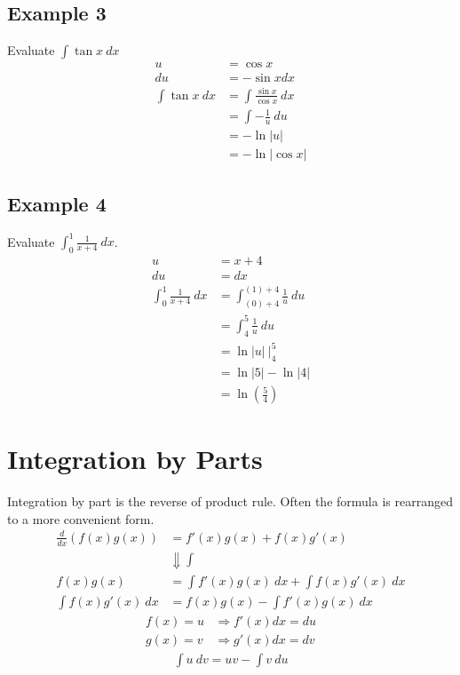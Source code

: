 \documentclass{article}
\theoremstyle{mytheoremstyle}
\theoremstyle{mytheoremstyle}
\theoremstyle{myproblemstyle}
\begin{document}
    \subsection*{Example 3}
    Evaluate $\int \tan x \ dx$
    \begin{align*}
        u &= \cos x \\
        du &= -\sin x dx \\
        \int \tan x \ dx
        &= \int \frac{\sin x}{\cos x} \ dx \\
        &= \int -\frac{1}{u} \ du \\
        &= -\ln |u| \\
        &= -\ln |\cos x|
    \end{align*}

    \subsection*{Example 4}
    Evaluate $\int_{0}^{1} \frac{1}{x+4} \ dx$.
    \begin{align*}
        u &= x+4 \\
        du &= dx \\
        \int_{0}^{1} \frac{1}{x+4} \ dx
        &= \int_{(0)+4}^{(1)+4} \frac{1}{u} \ du \\
        &= \int_{4}^{5} \frac{1}{u} \ du \\
        &= \ln|u| \ \Big|_{4}^{5} \\
        &= \ln|5| - \ln|4| \\
        &= \ln(\frac{5}{4})
    \end{align*}

    \section*{Integration by Parts}
    Integration by part is the reverse of product rule. Often the formula is
    rearranged to a more convenient form.
    \begin{align*}
        \frac{d}{dx} (f(x)g(x)) &=  f'(x)g(x) + f(x)g'(x) \\
                                &\Downarrow \int \\
        f(x)g(x) &= \int f'(x)g(x) \ dx + \int f(x)g'(x) \ dx \\
        \int f(x)g'(x) \ dx &= f(x)g(x)-\int f'(x)g(x) \ dx
    \end{align*}
    \begin{align*}
        f(x) = u &\Rightarrow f'(x)dx =du\\
        g(x) = v &\Rightarrow g'(x)dx = dv
    \end{align*}
    \begin{align*}
        \int u \ dv = uv - \int v \ du
    \end{align*}
\end{document}
